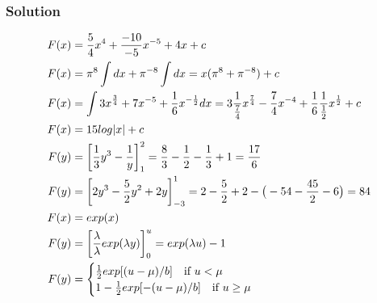 \documentclass[12pt,a4paper,titlepage]{article}\usepackage[]{graphicx}\usepackage[]{color}
\begin{document}
\subsubsection*{Solution}
\begin{align*}
F(x)&=\frac{5}{4}x^{4}+\frac{-10}{-5}x^{-5}+4x+c\\
F(x)&=\pi^{8} \int dx + \pi^{-8} \int dx=x(\pi^{8}+\pi^{-8})+c\\
F(x)&=\int 3x^{\frac{3}{4}}+7x^{-5}+\frac{1}{6}x^{-\frac{1}{2}}dx=3\frac{1}{\frac{7}{4}}x^{\frac{7}{4}}-\frac{7}{4}x^{-4}+\frac{1}{6}\frac{1}{\frac{1}{2}}x^{\frac{1}{2}}+c\\
F(x)&=15log|x|+c\\
F(y)&=\bigg[\frac{1}{3}y^{3}-\frac{1}{y}\bigg]_{1}^{2}=\frac{8}{3}-\frac{1}{2}-\frac{1}{3}+1=\frac{17}{6}\\
F(y)&=\bigg[2y^{3}-\frac{5}{2}y^{2}+2y\bigg]_{-3}^{1}=2-\frac{5}{2}+2-\big(-54-\frac{45}{2}-6 \big)=84\\
F(x)&=exp(x)\\
F(y)&=\bigg[\frac{\lambda}{\lambda}exp(\lambda y)\bigg]_{0}^{u}=exp(\lambda u)-1\\
F(y)&=\begin{cases} \frac{1}{2}exp[(u-\mu)/b] \quad \text{if $ u < \mu $} \\ 1-\frac{1}{2}exp[-(u-\mu)/b] \quad \text{if $ u \geq \mu $}  \end{cases}
\end{align*}
%
\end{document}
